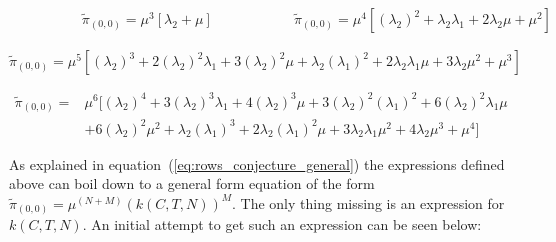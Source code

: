 \begin{multicols}{2}
    \begin{figure}[H]
        \centering
        \scalebox{0.8}{
            }
    \end{figure}
    \columnbreak
    \begin{figure}[H]
        \centering
        \scalebox{0.7}{
            }
    \end{figure}
\end{multicols}
\vspace{-0.5cm}
\begin{alignat}{2} \label{eq:00_rate_1131}
    \hspace{4em} & \tilde{\pi}_{(0,0)} = \mu^3[\lambda_2 + \mu] \hspace{5em} & 
    \tilde{\pi}_{(0,0)} = \mu^4[(\lambda_2)^2 + \lambda_2 \lambda_1 + 2\lambda_2 
    \mu + \mu^2]
\end{alignat}


\begin{figure}[H]
    \centering
    \scalebox{0.8}{
        }
\end{figure}
\begin{equation}\label{eq:00_rate_1141}
    \tilde{\pi}_{(0,0)} = \mu^5[(\lambda_2)^3 + 2(\lambda_2)^2 \lambda_1 + 
    3(\lambda_2)^2 \mu + \lambda_2 (\lambda_1)^2 + 2\lambda_2 \lambda_1 \mu + 
    3\lambda_2 \mu^2 + \mu^3]
\end{equation}

\begin{figure}[H]
    \centering
    \scalebox{0.8}{
        }
\end{figure}
\begin{align}\label{eq:00_rate_1151}
    \tilde{\pi}_{(0,0)} =& \mu^6[(\lambda_2)^4 + 3(\lambda_2)^3 \lambda_1 + 
    4(\lambda_2)^3 \mu + 3(\lambda_2)^2 (\lambda_1)^2 + 
    6(\lambda_2)^2 \lambda_1 \mu \\
    & + 6(\lambda_2)^2 \mu^2 + \lambda_2 (\lambda_1)^3 + 
    2\lambda_2 (\lambda_1)^2 \mu + 3\lambda_2 \lambda_1 \mu^2 + 
    4\lambda_2 \mu^3 + \mu^4] \nonumber
\end{align}


As explained in equation~(\ref{eq:rows_conjecture_general}) the expressions
defined above can boil down to a general form equation of the form 
\(\tilde{\pi}_{(0,0)} = \mu^{(N+M)} (k(C,T,N))^M\). 
The only thing missing is an expression for \(k(C,T,N)\). 
An initial attempt to get such an expression can be seen below:


